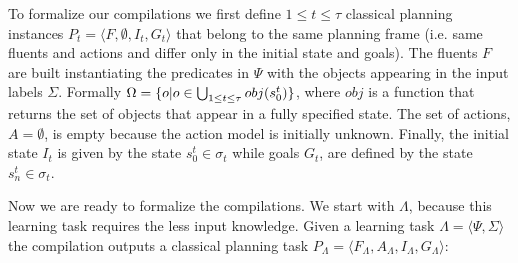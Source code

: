 \documentclass[letterpaper]{article} %
\newcommand{\tup}[1]{{\langle #1 \rangle}}
\begin{document}
To formalize our compilations we first define {\small $1\leq t\leq \tau$} classical planning instances $P_t=\tup{F,\emptyset,I_t,G_t}$ that belong to the same planning frame (i.e. same fluents and actions and differ only in the initial state and goals). The fluents $F$ are built instantiating the predicates in $\Psi$ with the objects appearing in the input labels $\Sigma$. Formally $\Omega=\{o|o\in \bigcup_{\small 1\leq t\leq \tau} obj(s_0^t)\}$, where $obj$ is a function that returns the set of objects that appear in a fully specified state. The set of actions, $A=\emptyset$, is empty because the action model is initially unknown. Finally, the initial state $I_t$ is given by the state $s_0^t\in \sigma_t$ while goals $G_t$, are defined by the state $s_n^t\in \sigma_t$.

Now we are ready to formalize the compilations. We start with $\Lambda$, because this learning task requires the less input knowledge. Given a learning task $\Lambda=\tup{\Psi,\Sigma}$ the compilation outputs a classical planning task $P_{\Lambda}=\tup{F_{\Lambda},A_{\Lambda},I_{\Lambda},G_{\Lambda}}$:
\end{document}
